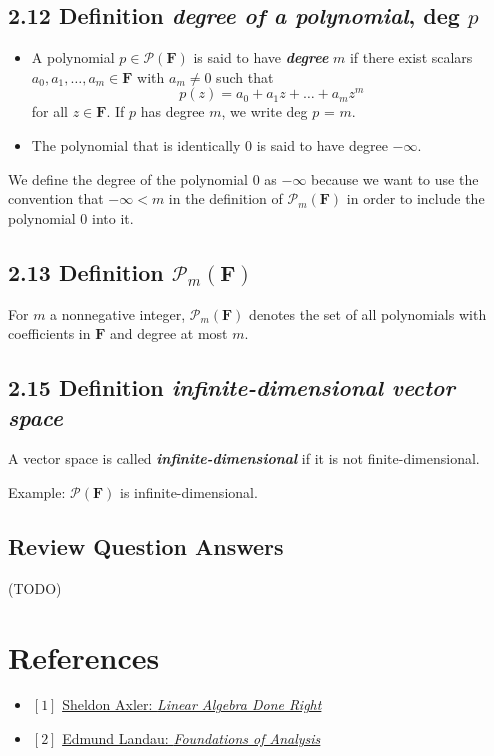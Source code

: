 \documentclass[12pt, letterpaper, oneside]{book}
\begin{document}
\section{2.12 Definition \textbf{\textit{degree of a polynomial}}, deg $p$}

\begin{itemize}
  \item A polynomial $p \in \mathcal{P}(\mathbf{F})$ is said to have \textbf{
    \textit{degree}} $m$ if there exist scalars $a_0, a_1, \ldots, a_m \in
    \mathbf{F}$ with $a_m \neq 0$ such that
    \[
      p(z) = a_0 + a_{1}z + \dots + a_{m}z^m
    \]
    for all $z \in \mathbf{F}$. If $p$ has degree $m$, we write deg $p$ = $m$.
  \item The polynomial that is identically 0 is said to have degree $-\infty$.
\end{itemize}

We define the degree of the polynomial $0$ as $-\infty$ because we want to use
the convention that $-\infty < m$ in the definition of $\mathcal{P}_m(\mathbf{
F})$ in order to include the polynomial $0$ into it.

\section{2.13 Definition $\mathcal{P}_m(\mathbf{F})$}

For $m$ a nonnegative integer, $\mathcal{P}_m(\mathbf{F})$ denotes the set of
all polynomials with coefficients in $\mathbf{F}$ and degree at most $m$.

\section{2.15 Definition \textbf{\textit{infinite-dimensional vector space}}}

A vector space is called \textbf{\textit{infinite-dimensional}} if it is not
finite-dimensional.

Example: $\mathcal{P}(\mathbf{F})$ is infinite-dimensional.

\section{Review Question Answers}

(TODO)

\chapter*{References}

\begin{itemize}
  \item $[1]$ \href{https://linear.axler.net/}{Sheldon Axler: \it{Linear Algebra Done Right}}
  \item $[2]$ \href{https://bookstore.ams.org/view?ProductCode=CHEL/79}{Edmund Landau: \it{Foundations of Analysis}}
\end{itemize}
\end{document}
